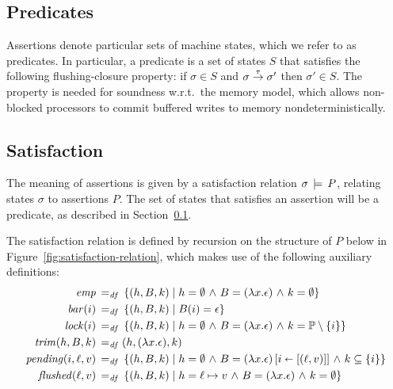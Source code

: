 \documentclass[11pt]{report}
\begin{document}
\subsection{Predicates}
\label{sec:predicates}

Assertions denote particular sets of machine states, which we refer to as predicates. In particular, a predicate is a set of states $S$ that satisfies the following flushing-closure property: if $\sigma \in S$ and $\sigma \stackrel{\tau}{\rightarrow} \sigma'$ then $\sigma' \in S$. The property is needed for soundness w.r.t.\ the memory model, which allows non-blocked processors to commit buffered writes to memory nondeterministically.  

\subsection{Satisfaction}

The meaning of assertions is given by a satisfaction relation $\sigma \,\models\, P$, relating states $\sigma$ to assertions $P$. The set of states that satisfies an assertion will be a predicate, as described in Section~\ref{sec:predicates}. 

The satisfaction relation is defined by recursion on the structure of $P$ below in Figure~\ref{fig:satisfaction-relation}, which makes use of the following auxiliary definitions: \begin{align*}
  \mathit{emp} \operatorname{\;=_{\mathit{df}}\;} & \left\lbrace (h,B,k) \mid h = \operatorname{\emptyset} \operatorname{\,\wedge\,} B = (\lambda x.\epsilon) \operatorname{\,\wedge\,} k = \operatorname{\emptyset} \right\rbrace \\ 
  \mathit{bar}(i) \operatorname{\;=_{\mathit{df}}\;} & \left\lbrace (h,B,k) \mid B(i) = \epsilon \right\rbrace \\ 
  \mathit{lock}(i) \operatorname{\;=_{\mathit{df}}\;} & \left\lbrace (h,B,k) \mid h = \operatorname{\emptyset} \operatorname{\,\wedge\,} B = (\lambda x.\epsilon) \operatorname{\,\wedge\,} k = \mathbb{P} \setminus \left\lbrace i \right\rbrace \right\rbrace \\ 
  \mathit{trim}(h,B,k) \operatorname{\;=_{\mathit{df}}\;} & (h,(\lambda x .\epsilon),k)\\  
  \mathit{pending}(i,\ell,v) \operatorname{\;=_{\mathit{df}}\;} & \left\lbrace (h,B,k) \mid h = \operatorname{\emptyset} \operatorname{\,\wedge\,} B = (\lambda x.\epsilon) \left[ i \shortleftarrow \left[(\ell,v)\right] \right] \operatorname{\,\wedge\,} k \subseteq \left\lbrace i \right\rbrace \right\rbrace \\ 
  \mathit{flushed}(\ell,v) \operatorname{\;=_{\mathit{df}}\;} & \left\lbrace (h,B,k) \mid h = \ell \mapsto v \operatorname{\,\wedge\,} B = (\lambda x .\epsilon) \operatorname{\,\wedge\,} k = \operatorname{\emptyset} \right\rbrace 
\end{align*}
\end{document}
